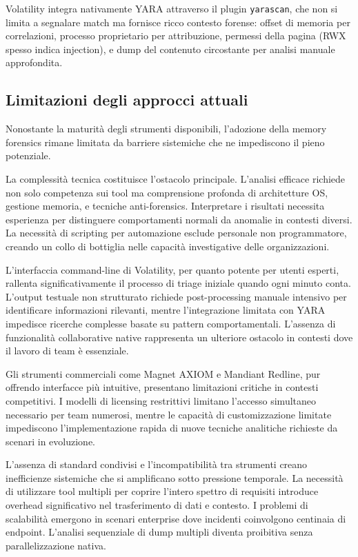 Volatility integra nativamente YARA attraverso il plugin \texttt{yarascan}, che non si limita a segnalare match ma fornisce ricco contesto forense: offset di memoria per correlazioni, processo proprietario per attribuzione, permessi della pagina (RWX spesso indica injection), e dump del contenuto circostante per analisi manuale approfondita.

\subsection{Limitazioni degli approcci attuali}

Nonostante la maturità degli strumenti disponibili, l'adozione della memory forensics rimane limitata da barriere sistemiche che ne impediscono il pieno potenziale.

La complessità tecnica costituisce l'ostacolo principale. L'analisi efficace richiede non solo competenza sui tool ma comprensione profonda di architetture OS, gestione memoria, e tecniche anti-forensics. Interpretare i risultati necessita esperienza per distinguere comportamenti normali da anomalie in contesti diversi. La necessità di scripting per automazione esclude personale non programmatore, creando un collo di bottiglia nelle capacità investigative delle organizzazioni.

L'interfaccia command-line di Volatility, per quanto potente per utenti esperti, rallenta significativamente il processo di triage iniziale quando ogni minuto conta. L'output testuale non strutturato richiede post-processing manuale intensivo per identificare informazioni rilevanti, mentre l'integrazione limitata con YARA impedisce ricerche complesse basate su pattern comportamentali. L'assenza di funzionalità collaborative native rappresenta un ulteriore ostacolo in contesti dove il lavoro di team è essenziale.

Gli strumenti commerciali come Magnet AXIOM e Mandiant Redline, pur offrendo interfacce più intuitive, presentano limitazioni critiche in contesti competitivi. I modelli di licensing restrittivi limitano l'accesso simultaneo necessario per team numerosi, mentre le capacità di customizzazione limitate impediscono l'implementazione rapida di nuove tecniche analitiche richieste da scenari in evoluzione.

L'assenza di standard condivisi e l'incompatibilità tra strumenti creano inefficienze sistemiche che si amplificano sotto pressione temporale. La necessità di utilizzare tool multipli per coprire l'intero spettro di requisiti introduce overhead significativo nel trasferimento di dati e contesto. I problemi di scalabilità emergono in scenari enterprise dove incidenti coinvolgono centinaia di endpoint. L'analisi sequenziale di dump multipli diventa proibitiva senza parallelizzazione nativa.

